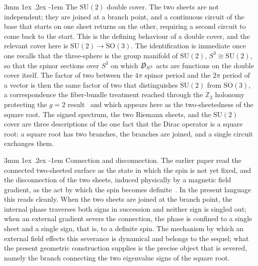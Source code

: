 \documentclass[%
 reprint, amsmath,amssymb, aps, prb, ]{revtex4-2}
\makeatletter
\numberwithin{equation}{section}
\renewcommand\paragraph{%
  \@startsection{paragraph}{4}{\z@}%
    {3mm \@plus 1ex \@minus .2ex}%
    {-1em}%
    {\normalfont\normalsize\itshape}}
\newcommand{\Dslash}{\slashed{D}}
\makeatother
\begin{document}
\paragraph{The $\mathrm{SU}(2)$ double cover.}
The two sheets are not independent; they are joined at a branch point, and a continuous circuit of the base that starts on one sheet returns on the other, requiring a second circuit to come back to the start. This is the defining behaviour of a double cover, and the relevant cover here is $\mathrm{SU}(2)\to\mathrm{SO}(3)$. The identification is immediate once one recalls that the three-sphere is the group manifold of $\mathrm{SU}(2)$, $S^{3}\cong\mathrm{SU}(2)$, so that the spinor sections over $S^{3}$ on which $\Dslash_{S^{3}}$ acts are functions on the double cover itself. The factor of two between the $4\pi$ spinor period and the $2\pi$ period of a vector is then the same factor of two that distinguishes $\mathrm{SU}(2)$ from $\mathrm{SO}(3)$, a correspondence the fiber-bundle treatment reached through the $\mathbb{Z}_{2}$ holonomy protecting the $g=2$ result~\cite{hanamura48} and which appears here as the two-sheetedness of the square root. The signed spectrum, the two Riemann sheets, and the $\mathrm{SU}(2)$ cover are three descriptions of the one fact that the Dirac operator is a square root: a square root has two branches, the branches are joined, and a single circuit exchanges them.

\paragraph{Connection and disconnection.}
The earlier paper read the connected two-sheeted surface as the state in which the spin is not yet fixed, and the disconnection of the two sheets, induced physically by a magnetic field gradient, as the act by which the spin becomes definite~\cite{hanamura03}. In the present language this reads cleanly. When the two sheets are joined at the branch point, the internal phase traverses both signs in succession and neither sign is singled out; when an external gradient severs the connection, the phase is confined to a single sheet and a single sign, that is, to a definite spin. The mechanism by which an external field effects this severance is dynamical and belongs to the sequel; what the present geometric construction supplies is the precise object that is severed, namely the branch connecting the two eigenvalue signs of the square root.

\end{document}
